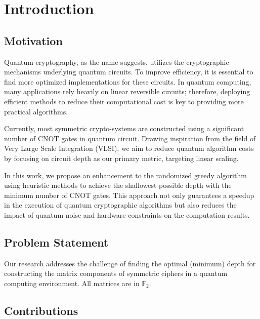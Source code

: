 \chapter{Introduction}

\section{Motivation}
Quantum cryptography, as the name suggests, utilizes the cryptographic mechanisms underlying quantum circuits. To improve efficiency, it is essential to find more optimized implementations for these circuits. In quantum computing, many applications rely heavily on linear reversible circuits; therefore, deploying efficient methods to reduce their computational cost is key to providing more practical algorithms.

Currently, most symmetric crypto-systems are constructed using a significant number of CNOT gates in quantum circuit. Drawing inspiration from the field of Very Large Scale Integration (VLSI), we aim to reduce quantum algorithm costs by focusing on circuit depth as our primary metric, targeting linear scaling.

In this work, we propose an enhancement to the randomized greedy algorithm using heuristic methods to achieve the shallowest possible depth with the minimum number of CNOT gates. This approach not only guarantees a speedup in the execution of quantum cryptographic algorithms but also reduces the impact of quantum noise and hardware constraints on the computation results.

\section{Problem Statement}
Our research addresses the challenge of finding the optimal (minimum) depth for constructing the matrix components of symmetric ciphers in a quantum computing environment. All matrices are in $\mathbb{F}_{2}$.

\section{Contributions}